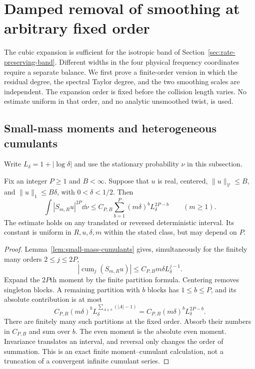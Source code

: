 \section{Damped removal of smoothing at arbitrary fixed order}
\label{sec:high-order-damped-unsmoothing}
The cubic expansion is sufficient for the isotropic band of
Section~\ref{sec:rate-preserving-band}. Different widths in the four
physical frequency coordinates require a separate balance. We first
prove a finite-order version in which the residual degree, the spectral
Taylor degree, and the two smoothing scales are independent. The
expansion order is fixed before the collision length varies. No estimate
uniform in that order, and no analytic unsmoothed twist, is used.

\subsection{Small-mass moments and heterogeneous cumulants}
Write $L_\delta=1+|\log\delta|$ and use the stationary probability
$\nu$ in this subsection.

\begin{lemma}
\label{lem:all-small-mass-moments}
Fix an integer $P\ge1$ and $B<\infty$. Suppose that $u$ is real,
centered, $\|u\|_{\mathcal V}\le B$, and
$\|u\|_1\le B\delta$, with $0<\delta<1/2$. Then
\begin{equation}\label{eq:all-small-mass-moments}
 \int|S_{m,R}u|^{2P}\dd\nu
 \le C_{P,B}\sum_{b=1}^{P}(m\delta)^bL_\delta^{2P-b}
 \qquad(m\ge1).
\end{equation}
The estimate holds on any translated or reversed deterministic
interval. Its constant is uniform in $R,u,\delta,m$ within the
stated class, but may depend on $P$.
\end{lemma}
\begin{proof}
Lemma~\ref{lem:small-mass-cumulants} gives, simultaneously for the
finitely many orders $2\le j\le2P$,
\[
 |\operatorname{cum}_j(S_{m,R}u)|
          \le C_{P,B}m\delta L_\delta^{j-1}.
\]
Expand the $2P$th moment by the finite partition formula. Centering
removes singleton blocks. A remaining partition with $b$ blocks has
$1\le b\le P$, and its absolute contribution is at most
\[
 C_{P,B}(m\delta)^b
       L_\delta^{\sum_{A\in\pi}(|A|-1)}
 =C_{P,B}(m\delta)^bL_\delta^{2P-b}.
\]
There are finitely many such partitions at the fixed order. Absorb
their numbers in $C_{P,B}$ and sum over $b$. The even moment is the
absolute even moment. Invariance translates an interval, and reversal
only changes the order of summation. This is an exact finite
moment--cumulant calculation, not a truncation of a convergent
infinite cumulant series.
\end{proof}

